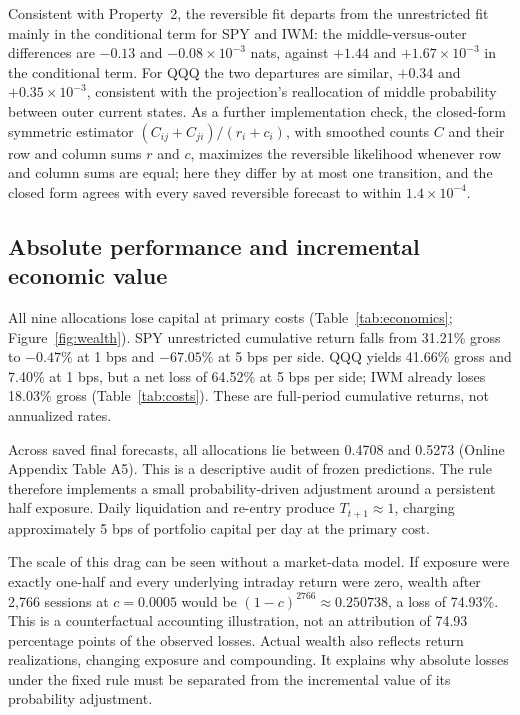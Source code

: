 Consistent with Property~2, the reversible fit departs from the unrestricted fit mainly in the conditional term for SPY and IWM: the middle-versus-outer differences are $-0.13$ and $-0.08\times10^{-3}$ nats, against $+1.44$ and $+1.67\times10^{-3}$ in the conditional term. For QQQ the two departures are similar, $+0.34$ and $+0.35\times10^{-3}$, consistent with the projection's reallocation of middle probability between outer current states. As a further implementation check, the closed-form symmetric estimator $(C_{ij}+C_{ji})/(r_i+c_i)$, with smoothed counts $C$ and their row and column sums $r$ and $c$, maximizes the reversible likelihood whenever row and column sums are equal; here they differ by at most one transition, and the closed form agrees with every saved reversible forecast to within $1.4\times10^{-4}$.

\subsection{Absolute performance and incremental economic value}\label{sec:economics}
All nine allocations lose capital at primary costs (Table~\ref{tab:economics}; Figure~\ref{fig:wealth}). SPY unrestricted cumulative return falls from 31.21\% gross to $-0.47\%$ at 1 bps and $-67.05\%$ at 5 bps per side. QQQ yields 41.66\% gross and 7.40\% at 1 bps, but a net loss of 64.52\% at 5 bps per side; IWM already loses 18.03\% gross (Table~\ref{tab:costs}). These are full-period cumulative returns, not annualized rates.

Across saved final forecasts, all allocations lie between 0.4708 and 0.5273 (Online Appendix Table A5). This is a descriptive audit of frozen predictions. The rule therefore implements a small probability-driven adjustment around a persistent half exposure. Daily liquidation and re-entry produce $T_{t+1}\approx1$, charging approximately 5 bps of portfolio capital per day at the primary cost.

The scale of this drag can be seen without a market-data model. If exposure were exactly one-half and every underlying intraday return were zero, wealth after 2,766 sessions at $c=0.0005$ would be $(1-c)^{2766}\approx0.250738$, a loss of 74.93\%. This is a counterfactual accounting illustration, not an attribution of 74.93 percentage points of the observed losses. Actual wealth also reflects return realizations, changing exposure and compounding. It explains why absolute losses under the fixed rule must be separated from the incremental value of its probability adjustment.

